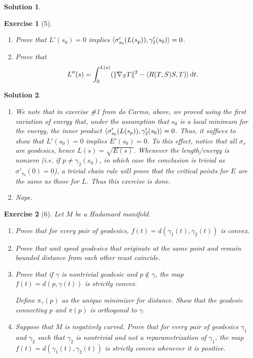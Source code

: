 \documentclass{article}
\theoremstyle{plain}
\newtheorem*{ex}{Exercise}
\theoremstyle{nonumberplain}
\newtheorem{sol}{Solution}
\DeclarePairedDelimiter{\Norm}{\lVert}{\rVert}
\DeclarePairedDelimiter{\braket}{\langle}{\rangle}
\begin{document}
\begin{sol}
\end{sol}

\begin{ex}[5]
\leavevmode
\begin{enumerate}
\item Prove that $L'(s_0) = 0$ implies $\braket{\sigma'_{s_0}(L(s_p)), \gamma_2'(s_0)} = 0$.
\item Prove that
\begin{equation}
L''(s) = \int_0^{L(s)} (\Norm{\nabla_S T}^2 - \braket{R(T,S)S,T)} \dl t.
\end{equation}
\end{enumerate}
\end{ex}

\begin{sol}
\leavevmode
\begin{enumerate}
\item We note that in exercise \#1 from do Carmo, above, we proved using the first variation of energy that, under the assumption that $s_0$ is a local minimum for the energy, the inner product $\braket{\sigma'_{s_0}(L(s_p)),\gamma_2'(s_0)} = 0$. Thus, it suffices to show that $L'(s_0) = 0$ implies $E'(s_0) = 0$. To this effect, notice that all $\sigma_s$ are geodesics, hence $L(s) = \sqrt{E(s)}$. Whenever the length/energy is nonzero (i.e. if $p \neq \gamma_2(s_0)$, in which case the conclusion is trivial as $\sigma'_{s_0}(0) = 0$), a trivial chain rule will prove that the critical points for $E$ are the same as those for $L$. Thus this exercise is done.

\item Nope.
\end{enumerate}
\end{sol}

\begin{ex}[6]
Let $M$ be a Hadamard manifold.
\begin{enumerate}
\item Prove that for every pair of geodesics, $f(t) = d(\gamma_1(t),\gamma_2(t))$ is convex.
\item Prove that unit speed geodesics that originate at the same point and remain bounded distance from each other must coincide.
\item Prove that if $\gamma$ is nontrivial geodesic and $p \notin \gamma$, the map $f(t) = d(p,\gamma(t))$ is strictly convex.

Define $\pi_\gamma(p)$ as the unique minimizer for distance. Show that the geodesic connecting $p$ and $\pi(p)$ is orthogonal to $\gamma$.
\item Suppose that $M$ is negatively curved. Prove that for every pair of geodesics $\gamma_1$ and $\gamma_2$ such that $\gamma_2$ is nontrivial and not a reparametrization of $\gamma_1$, the map $f(t) = d(\gamma_1(t), \gamma_2(t))$ is strictly convex whenever it is positive.
\end{enumerate}
\end{ex}
\end{document}

